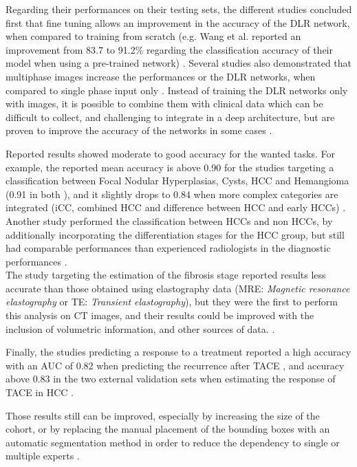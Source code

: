 \documentclass[]{article}
\begin{document}
Regarding their performances on their testing sets, the different
studies concluded first that fine tuning allows an improvement in the
accuracy of the DLR network, when compared to training from
scratch (e.g. Wang et al. reported an improvement from 83.7 to 91.2\%
regarding the classification accuracy of their model when using a
pre-trained network) \cite{Wang2018,Yamada2019}. Several studies also demonstrated that multiphase images
increase the performances or the DLR networks, when compared to
single phase input only \cite{Yasaka2018}. Instead of
training the DLR networks only with images, it is possible to
combine them with clinical data which can be difficult to collect, and
challenging to integrate in a deep architecture, but are proven to
improve the accuracy of the networks in some cases \cite{WANG2019}.

Reported results showed moderate to good accuracy for the wanted tasks.
For example, the reported mean accuracy is above 0.90 for the studies
targeting a classification between Focal Nodular Hyperplasias, Cysts,
HCC and Hemangioma (0.91 in both \cite{Liang2018,Wang2018}), and it slightly drops to 0.84 when more complex categories
are integrated (iCC, combined HCC and difference between HCC and early
HCCs) \cite{Yasaka2018a}. Another study performed the
classification between HCCs and non HCCs, by additionally incorporating
the differentiation stages for the HCC group, but still had comparable
performances than experienced radiologists in the diagnostic
performances \cite{Yamada2019}.\\
The study targeting the estimation of the fibrosis stage reported
results less accurate than those obtained using elastography data
(MRE: \emph{Magnetic resonance elastography} or TE: \emph{Transient
elastography}), but they were the first to perform this analysis on CT
images, and their results could be improved with the inclusion of
volumetric information, and other sources of data. \cite{Yasaka2018a}.

Finally, the studies predicting a response to a treatment reported a
high accuracy with an AUC of 0.82 when predicting the recurrence after
TACE \cite{WANG2019}, and accuracy above 0.83 in the two
external validation sets when estimating the response of TACE in HCC
\cite{Peng2020}.

Those results still can be improved, especially by increasing the size
of the cohort, or by replacing the manual placement of the bounding
boxes with an automatic segmentation method in order to reduce the
dependency to single or multiple experts \cite{Yasaka2018a,Peng2020}.
\end{document}
